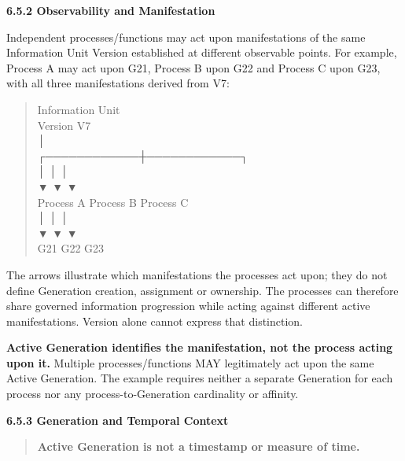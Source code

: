 \par\medskip\textbf{6.5.2 Observability and Manifestation}\par


Independent processes/functions may act upon manifestations of the same
Information Unit Version established at different observable points. For
example, Process A may act upon G21, Process B upon G22 and Process C upon G23,
with all three manifestations derived from V7:



\begin{quote}\small\ttfamily
                Information Unit\\
                   Version V7\\
                       │\\
          ┌────────────┼────────────┐\\
          │            │            │\\
          ▼            ▼            ▼\\
      Process A    Process B    Process C\\
          │            │            │\\
          ▼            ▼            ▼\\
         G21          G22          G23\\

\end{quote}


The arrows illustrate which manifestations the processes act upon; they do not
define Generation creation, assignment or ownership. The processes can therefore
share governed information progression while acting against different active
manifestations. Version alone cannot express that distinction.



\textbf{Active Generation identifies the manifestation, not the process acting upon
it.} Multiple processes/functions MAY legitimately act upon the same Active
Generation. The example requires neither a separate Generation for each process
nor any process-to-Generation cardinality or affinity.



\par\medskip\textbf{6.5.3 Generation and Temporal Context}\par


\begin{quote}


\textbf{Active Generation is not a timestamp or measure of time.}



\end{quote}


